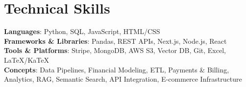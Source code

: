 \documentclass[letterpaper,11pt]{article}
\begin{document}
\section{Technical Skills}
 \begin{itemize}[leftmargin=0.15in, label={}]
    \small{\item{
     \textbf{Languages}{: Python, SQL, JavaScript, HTML/CSS} \\
     \textbf{Frameworks \& Libraries}{: Pandas, REST APIs, Next.js, Node.js, React} \\
     \textbf{Tools \& Platforms}{: Stripe, MongoDB, AWS S3, Vector DB, Git, Excel, LaTeX/KaTeX} \\
     \textbf{Concepts}{: Data Pipelines, Financial Modeling, ETL, Payments \& Billing, Analytics, RAG, Semantic Search, API Integration, E-commerce Infrastructure}
    }}
 \end{itemize}
\end{document}
